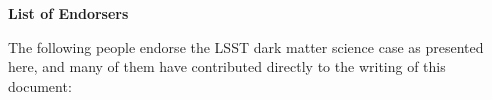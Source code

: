 
\begin{center}
  {\Large \bf List of Endorsers}
\end{center}
\bigskip

The following people endorse the LSST dark matter science case as presented here, and many of them have contributed directly to the writing of this document:

\def\altaffilmark#1{\textsuperscript{#1}}
\def\affil#1{\noindent #1 \\}

\normalsize
\begin{raggedright}


\end{raggedright}
